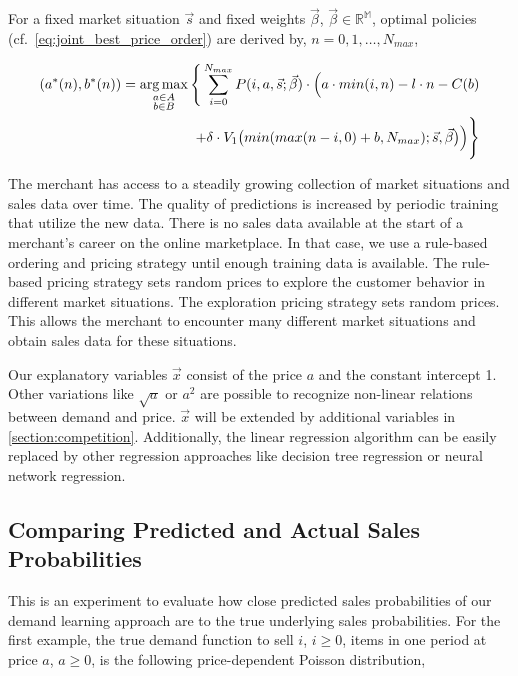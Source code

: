 For a fixed market situation $\vec{s}$ and fixed weights $\vec{\beta}$, $\vec{\beta} \in \mathbb{R^M}$, optimal policies (cf.~\cref{eq:joint_best_price_order}) are derived by, $n=0, 1, \ldots, N_{max}$,

\begin{equation}
\begin{split}
(a^*(n), b^*(n)) = \argmax_{\substack{a \in A \\ b \in B}} \Bigg\{
\sum_{i = 0}^{N_{max}}
P(i, a, \vec{s}; \vec{\beta}) \cdot \Big(
a \cdot min(i, n) %
- l \cdot n %
- C(b) %
\\
+ \delta \cdot V_{1}\big(min(max(n - i, 0) + b, N_{max}); \vec{s}, \vec{\beta}\big)
\Big)\Bigg\}
\end{split}
\end{equation}

The merchant has access to a steadily growing collection of market situations and sales data over time.
The quality of predictions is increased by periodic training that utilize the new data.
There is no sales data available at the start of a merchant's career on the online marketplace.
In that case, we use a rule-based ordering and pricing strategy until enough training data is available.
The rule-based pricing strategy sets random prices to explore the customer behavior in different market situations.
The exploration pricing strategy sets random prices.
This allows the merchant to encounter many different market situations and obtain sales data for these situations.

Our explanatory variables $\vec{x}$ consist of the price $a$ and the constant intercept 1.
Other variations like $\sqrt{a}$ or $a^2$ are possible to recognize non-linear relations between demand and price.
$\vec{x}$ will be extended by additional variables in \cref{section:competition}.
Additionally, the linear regression algorithm can be easily replaced by other regression approaches like decision tree regression or neural network regression.

\subsection{Comparing Predicted and Actual Sales Probabilities}
\label{section:prediction_quality}

This is an experiment to evaluate how close predicted sales probabilities of our demand learning approach are to the true underlying sales probabilities.
For the first example, the true demand function to sell $i$, $i \geq 0$, items in one period at price $a$, $a \geq 0$, is the following price-dependent Poisson distribution,


